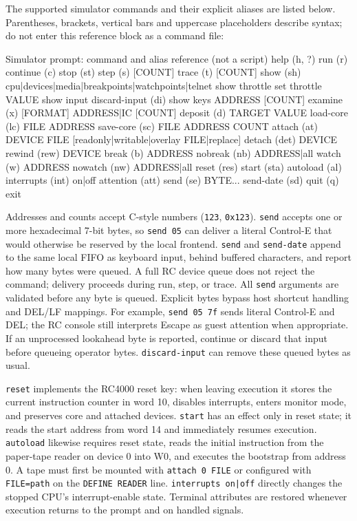 The supported simulator commands and their explicit aliases are listed below. Parentheses, brackets, vertical bars and uppercase placeholders describe syntax; do not enter this reference block as a command file:

\begin{commandexample}{Simulator prompt: command and alias reference (not a script)}
help (h, ?)
run (r)             continue (c)
stop (st)           step (s) [COUNT]   trace (t) [COUNT]
show (sh) cpu|devices|media|breakpoints|watchpoints|telnet
show throttle       set throttle VALUE
show input          discard-input (di)
show keys ADDRESS [COUNT]
examine (x) [FORMAT] ADDRESS|IC [COUNT]
deposit (d) TARGET VALUE
load-core (lc) FILE ADDRESS
save-core (sc) FILE ADDRESS COUNT
attach (at) DEVICE FILE [readonly|writable|overlay FILE|replace]
detach (det) DEVICE
rewind (rew) DEVICE
break (b) ADDRESS   nobreak (nb) ADDRESS|all
watch (w) ADDRESS   nowatch (nw) ADDRESS|all
reset (res)         start (sta)       autoload (al)
interrupts (int) on|off
attention (att)     send (se) BYTE...
send-date (sd)
quit (q)            exit
\end{commandexample}

Addresses and counts accept C-style numbers (\passthrough{\lstinline!123!}, \passthrough{\lstinline!0x123!}). \passthrough{\lstinline!send!} accepts one or more hexadecimal 7-bit bytes, so \passthrough{\lstinline!send 05!} can deliver a literal Control-E that would otherwise be reserved by the local frontend. \passthrough{\lstinline!send!} and \passthrough{\lstinline!send-date!} append to the same local FIFO as keyboard input, behind buffered characters, and report how many bytes were queued. A full RC device queue does not reject the command; delivery proceeds during run, step, or trace. All \passthrough{\lstinline!send!} arguments are validated before any byte is queued. Explicit bytes bypass host shortcut handling and DEL/LF mappings. For example, \passthrough{\lstinline!send 05 7f!} sends literal Control-E and DEL; the RC console still interprets Escape as guest attention when appropriate. If an unprocessed lookahead byte is reported, continue or discard that input before queueing operator bytes. \passthrough{\lstinline!discard-input!} can remove these queued bytes as usual.

\passthrough{\lstinline!reset!} implements the RC4000 reset key: when leaving execution it stores the current instruction counter in word 10, disables interrupts, enters monitor mode, and preserves core and attached devices. \passthrough{\lstinline!start!} has an effect only in reset state; it reads the start address from word 14 and immediately resumes execution. \passthrough{\lstinline!autoload!} likewise requires reset state, reads the initial instruction from the paper-tape reader on device 0 into W0, and executes the bootstrap from address 0. A tape must first be mounted with \passthrough{\lstinline!attach 0 FILE!} or configured with \passthrough{\lstinline!FILE=path!} on the \passthrough{\lstinline!DEFINE READER!} line. \passthrough{\lstinline!interrupts on|off!} directly changes the stopped CPU's interrupt-enable state. Terminal attributes are restored whenever execution returns to the prompt and on handled signals.

